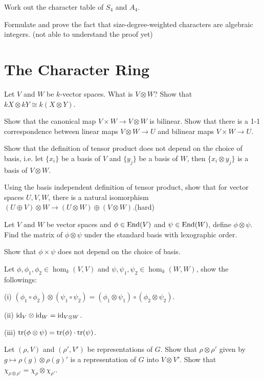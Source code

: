 \begin{question}{29}
	Work out the character table of $S_4$ and $A_4$.
\end{question}

\begin{question}{30}
	Formulate and prove the fact that size-degree-weighted characters are algebraic integers. (not able to understand the proof yet)
\end{question}

\section{The Character Ring}
\begin{question}{31}
	Let $V$ and $W$ be $k$-vector spaces. What is $V \otimes W$? Show that $kX \otimes kY \cong k(X \otimes Y)$.
	
	Show that the canonical map $V \times W \rightarrow V \otimes W$ is bilinear. Show that there is a 1-1 correspondence between linear maps $V \otimes W \rightarrow U$ and bilinear maps $V \times W \rightarrow U$.
	
	Show that the definition of tensor product does not depend on the choice of basis, i.e. let $\{x_i\}$ be a basis of $V$ and $\{y_j\}$ be a basis of $W$, then $\{x_i \otimes y_j\}$ is a basis of $V \otimes W$.
	
	Using the basis independent definition of tensor product, show that for vector spaces $U, V, W$, there is a natural isomorphism $(U \oplus V) \otimes W \rightarrow (U \otimes W) \oplus (V \otimes W)$.(hard) 
\end{question}

\begin{question}{32}
	Let $V$ and $W$ be vector spaces and $\phi \in \text{End} (V)$ and $\psi \in \text{End} (W)$, define $\phi \otimes \psi$. Find the matrix of $\phi \otimes \psi$ under the standard basis with lexographic order.
	
	Show that $\phi \times \psi$ does not depend on the choice of basis.
	
	\bigskip
	
	Let $\phi, \phi_1, \phi_2 \in \hom_k(V,V)$ and $\psi, \psi_1, \psi_2 \in \hom_k(W,W)$, show the followings:
	
	(i) $(\phi_1 \circ \phi_2) \otimes (\psi_1 \circ \psi_2) = (\phi_1 \otimes \psi_1) \circ (\phi_2 \otimes \psi_2)$.
	
	(ii) $\text{id}_V \otimes \text{id}_W = \text{id}_{V\otimes W}$.
	
	(iii) $\text{tr} (\phi \otimes \psi) = \text{tr}(\phi) \cdot \text{tr} (\psi)$.
	
	\bigskip
	
	Let $(\rho,V)$ and $(\rho',V')$ be representations of $G$. Show that $\rho \otimes \rho'$ given by $g \mapsto \rho(g) \otimes \rho(g)'$ is a representation of $G$ into $V \otimes V'$. Show that $\chi_{\rho\otimes \rho'} = \chi_\rho \otimes \chi_{\rho'}$.
\end{question}

